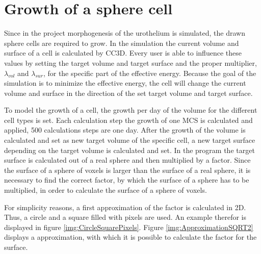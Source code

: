 \section{Growth of a sphere cell}
Since in the project morphogenesis of the urothelium is simulated, the drawn sphere cells are required to grow. \newline
In the simulation the current volume and surface of a cell is calculated by \ac{CC3D}. Every user is able to influence these values by setting the target volume and target surface and the proper multiplier, $\lambda_{vol}$ and $\lambda_{sur}$, for the specific part of the effective energy. Because the goal of the simulation is to minimize the effective energy, the cell will change the current volume and surface in the direction of the set target volume and target surface. 

To model the growth of a cell, the growth per day of the volume for the different cell types is set. Each calculation step the growth of one \ac{MCS} is calculated and applied, 500 calculations steps are one day. After the growth of the volume is calculated and set as new target volume of the specific cell, a new target surface depending on the target volume is calculated and set. \newline
In the program the target surface is calculated out of a real sphere and then multiplied by a factor.
Since the surface of a sphere of voxels is larger than the surface of a real sphere, it is necessary to find the correct factor, by which the surface of a sphere has to be multiplied, in order to calculate the surface of a sphere of voxels. 

For simplicity reasons, a first approximation of the factor is calculated in 2D. Thus, a circle and a square filled with pixels are used. An example therefor is displayed in figure \ref{img:CircleSquarePixels}. \newline
Figure \ref{img:ApproximationSQRT2} displays a approximation, with which it is possible to calculate the factor for the surface. 

